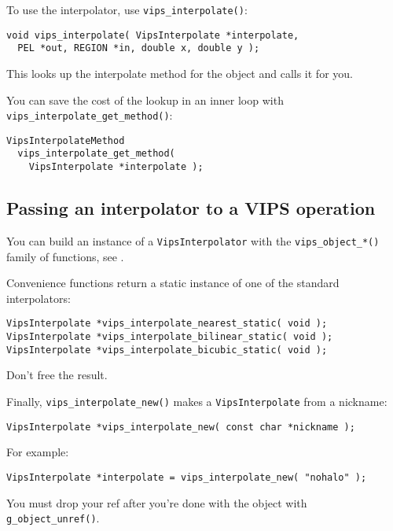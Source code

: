 To use the interpolator, use \verb+vips_interpolate()+:

\begin{verbatim}
void vips_interpolate( VipsInterpolate *interpolate,
  PEL *out, REGION *in, double x, double y );
\end{verbatim}

\noindent
This looks up the interpolate method for the object and calls it for you.

You can save the cost of the lookup in an inner loop with
\verb+vips_interpolate_get_method()+:

\begin{verbatim}
VipsInterpolateMethod 
  vips_interpolate_get_method( 
    VipsInterpolate *interpolate );
\end{verbatim}

\subsection{Passing an interpolator to a VIPS operation}

You can build an instance of a \verb+VipsInterpolator+ with
the \verb+vips_object_*()+ family of functions, see .

Convenience functions return a static instance of one of the standard
interpolators:

\begin{verbatim}
VipsInterpolate *vips_interpolate_nearest_static( void );
VipsInterpolate *vips_interpolate_bilinear_static( void );
VipsInterpolate *vips_interpolate_bicubic_static( void );
\end{verbatim}

\noindent
Don't free the result.

Finally, \verb+vips_interpolate_new()+ makes a \verb+VipsInterpolate+ from a
nickname:

\begin{verbatim}
VipsInterpolate *vips_interpolate_new( const char *nickname );
\end{verbatim}

For example:

\begin{verbatim}
VipsInterpolate *interpolate = vips_interpolate_new( "nohalo" );
\end{verbatim}

\noindent
You must drop your ref after you're done with the object with
\verb+g_object_unref()+.
